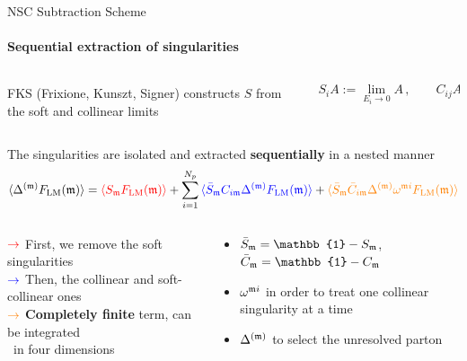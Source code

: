 \begin{frame} {NSC Subtraction Scheme}
   \framesubtitle{Sequential extraction of singularities}
\begin{columns}
\begin{column}{0.50\textwidth}
  \begin{center}
    FKS (Frixione, Kunszt, Signer) constructs $S$ from the soft and collinear limits
  \end{center}

    \end{column}

    \begin{column}{0.50\textwidth}
    \begin{equation*}
    S_i A := \lim_{E_i \to 0} A \, , \qquad C_{ij}A := \lim_{\rho_{ij}\to 0}A 
\end{equation*}
    \end{column}
\end{columns}
 \vspace{1.5em}

The singularities are isolated and extracted \textbf{sequentially} in a nested manner
\begin{equation*}
  \langle \Delta^{(\mathfrak{m})}F_{\mathrm{LM}}(\mathfrak{m}) \rangle = \textcolor{red}{\langle S_{\mathfrak{m}}F_{\mathrm{LM}}(\mathfrak{m}) \rangle} + \sum_{i=1}^{N_p} \textcolor{blue}{\langle \bar{S}_{\mathfrak{m}}C_{i\mathfrak{m}} \Delta^{(\mathfrak{m})} F_{\mathrm{LM}}(\mathfrak{m}) \rangle} + \textcolor{orange}{\langle \bar{S}_{\mathfrak{m}} \bar{C}_{i\mathfrak{m}} \Delta^{(\mathfrak{m})} \omega^{\mathfrak{m} i} F_{\mathrm{LM}}(\mathfrak{m}) \rangle}
\end{equation*}

\begin{columns}
\begin{column}{0.50\textwidth}
    $\textcolor{red}{\to}$ First, we remove the soft singularities\\
$\textcolor{blue}{\to}$ Then, the collinear and soft-collinear ones\\
$\textcolor{orange}{\to}$ \textbf{Completely finite} term, can be integrated\\ \, \quad in four dimensions

    \end{column}

    \begin{column}{0.50\textwidth}
    \begin{itemize}
      \item $\bar{S}_\um= \mathbb{1} - S_\um$, $\bar{ C}_\um= \mathbb{1} - C_\um$
      \item $\omega^{\mathfrak{m} i}$ in order to treat one collinear singularity at a time
      \item $\Delta^{(\mathfrak{m})}$ to select the unresolved parton
    \end{itemize}
    \end{column}
\end{columns}


\end{frame}

